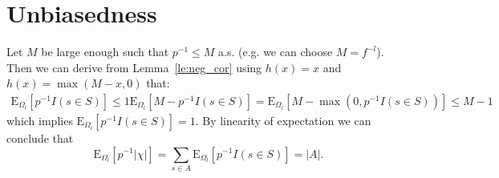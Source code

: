 \documentclass{article}
\newcommand{\expectation}{\mathrm{E}}
\theoremstyle{definition}
\begin{document}
\section{Unbiasedness}
Let $M$ be large enough such that $p^{-1} \leq M$ a.s. (e.g. we can choose $M = f^{-l}$). Then we can derive from Lemma~\ref{le:neg_cor} using $h(x) = x$ and $h(x) = \max(M-x,0)$ that:
\begin{eqnarray*}
  \expectation_{\Omega_l} [ p^{-1} I(s \in S) ] \leq 1
  \expectation_{\Omega_l} [ M - p^{-1} I(s \in S) ] = \expectation_{\Omega_l} [ M - \max(0,p^{-1} I(s \in S)) ] \leq M-1  
\end{eqnarray*}
which implies $\expectation_{\Omega_l} [ p^{-1} I(s \in S) ] = 1$.
By linearity of expectation we can conclude that
\[
  \expectation_{\Omega_l} [ p^{-1} |\chi| ] = \sum_{s \in A} \expectation_{\Omega_l} [ p^{-1} I(s \in S) ] = |A| \textrm{.}
\]

 
\end{document}
